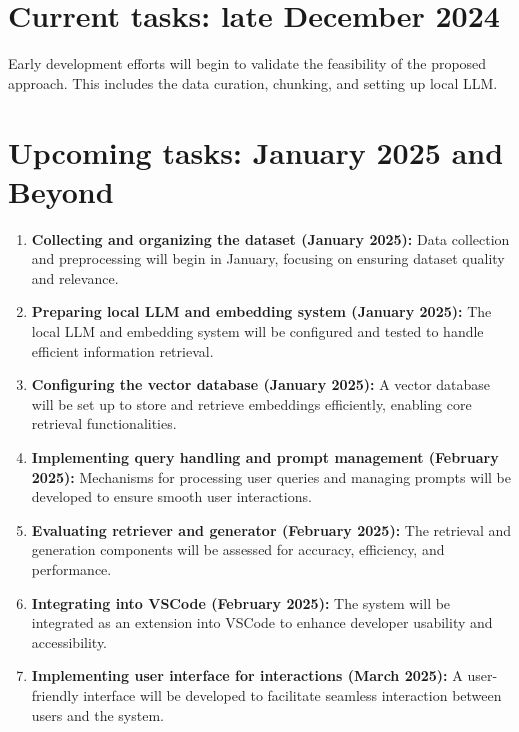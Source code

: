 \section{Current tasks: late December 2024}

Early development efforts will begin to validate the feasibility of the proposed approach. This includes the data curation, chunking, and setting up local LLM.

\section{Upcoming tasks: January 2025 and Beyond}

\begin{enumerate}
    \item \textbf{Collecting and organizing the dataset (January 2025):}
    Data collection and preprocessing will begin in January, focusing on ensuring dataset quality and relevance.

    \item \textbf{Preparing local LLM and embedding system (January 2025):}
    The local LLM and embedding system will be configured and tested to handle efficient information retrieval.

    \item \textbf{Configuring the vector database (January 2025):}
    A vector database will be set up to store and retrieve embeddings efficiently, enabling core retrieval functionalities.

    \item \textbf{Implementing query handling and prompt management (February 2025):}
    Mechanisms for processing user queries and managing prompts will be developed to ensure smooth user interactions.

    \item \textbf{Evaluating retriever and generator (February 2025):}
    The retrieval and generation components will be assessed for accuracy, efficiency, and performance.

    \item \textbf{Integrating into VSCode (February 2025):}
    The system will be integrated as an extension into VSCode to enhance developer usability and accessibility.

    \item \textbf{Implementing user interface for interactions (March 2025):}
    A user-friendly interface will be developed to facilitate seamless interaction between users and the system.


\end{enumerate}
